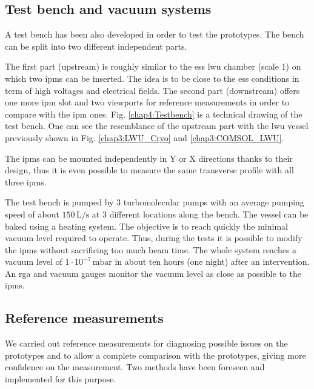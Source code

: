 \begin{refsection}

  

  \subsection{Test bench and vacuum systems}
  A test bench has been also developed in order to test the prototypes. The bench can be split into two different independent parts.

  The first part (upstream) is roughly similar to the \acrshort{ess} \acrshort{lwu} chamber (scale 1) on which two \acrshort{ipm}s can be inserted. The idea is to be close to the \acrshort{ess} conditions in term of high voltages and electrical fields. The second part (downstream) offers one more \acrshort{ipm} slot and two viewports for reference measurements in order to compare with the \acrshort{ipm} ones. Fig. \ref{chap4:Testbench} is a technical drawing of the test bench. One can see the resemblance of the upstream part with the \acrshort{lwu} vessel previously shown in Fig. \ref{chap3:LWU_Cryo} and \ref{chap3:COMSOL_LWU}.


  The \acrshort{ipm}s can be mounted independently in Y or X directions thanks to their design, thus it is even possible to measure the same transverse profile with all three \acrshort{ipm}s.

  

  The test bench is pumped by 3 turbomolecular pumps with an average pumping speed of about $150\,\mathrm{L/s}$ at 3 different locations along the bench. The vessel can be baked using a heating system. The objective is to reach quickly the minimal vacuum level required to operate. Thus, during the tests it is possible to modify the \acrshort{ipm}s without sacrificing too much beam time. The whole system reaches a vacuum level of $1\cdot 10^{-7}\,\mathrm{mbar}$ in about ten hours (one night) after an intervention. An \acrfull{rga} and vacuum gauges monitor the vacuum level as close as possible to the \acrshort{ipm}s.

  \subsection{Reference measurements}
  \label{chap4:sec:ref}
  We carried out reference measurements for diagnosing possible issues on the prototypes and to allow a complete comparison with the prototypes, giving more confidence on the measurement. Two methods have been foreseen and implemented for this purpose.


\end{refsection}
